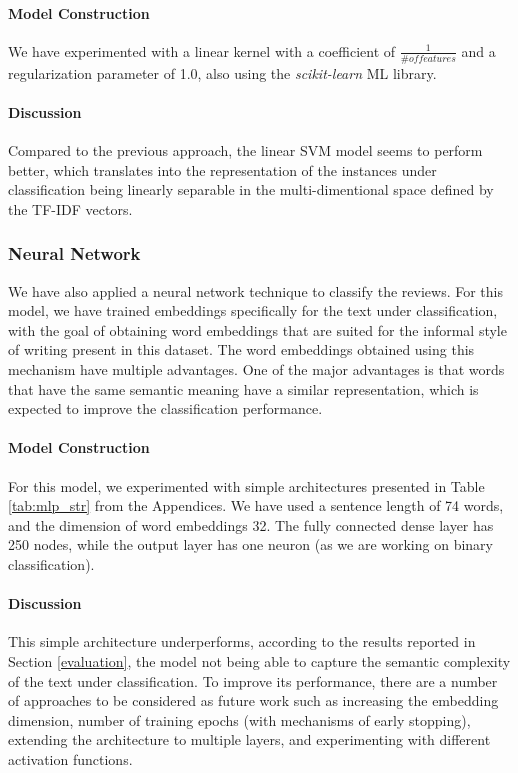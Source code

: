 \paragraph{Model Construction}
We have experimented with a linear kernel with a coefficient of $\frac{1}{\# of features}$ and a regularization parameter of 1.0, also using the \textit{scikit-learn} ML library.

\paragraph{Discussion}
Compared to the previous approach, the linear SVM model seems to perform better, which translates into the representation of the instances under classification being linearly separable in the multi-dimentional space defined by the TF-IDF vectors.

\subsubsection{Neural Network}
We have also applied a neural network technique to classify the reviews. For this model, we have trained embeddings specifically for the text under classification, with the goal of obtaining word embeddings that are suited for the informal style of writing present in this dataset.
The word embeddings obtained using this mechanism have multiple advantages. One of the major advantages is that words that have the same semantic meaning have a similar representation, which is expected to improve the classification performance.

\paragraph{Model Construction}
For this model, we experimented with simple architectures presented in Table \ref{tab:mlp_str} from the Appendices. We have used a sentence length of 74 words, and the dimension of word embeddings 32. The fully connected dense layer has 250 nodes, while the output layer has one neuron (as we are working on binary classification). 

\paragraph{Discussion}
This simple architecture underperforms, according to the results reported in Section \ref{evaluation}, the model not being able to capture the semantic complexity of the text under classification. To improve its performance, there are a number of approaches to be considered as future work such as increasing the embedding dimension, number of training epochs (with mechanisms of early stopping), extending the architecture to multiple layers, and experimenting with different activation functions.

